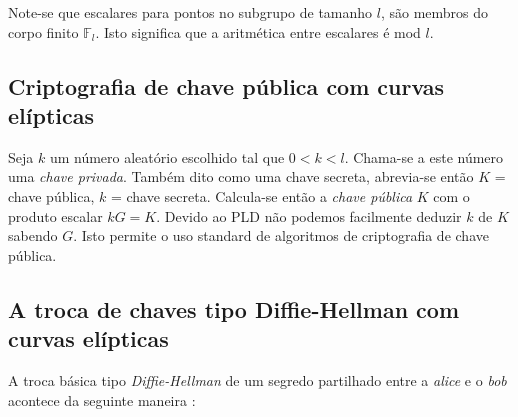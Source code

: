 Note-se que escalares para pontos no subgrupo de tamanho $l$, são membros do corpo finito $\mathbb{F}_l$. Isto significa que a aritmética entre escalares é mod $l$.



\subsection{Criptografia de chave pública com curvas elípticas}
\label{ec:keys}

Seja \(k\) um número aleatório escolhido tal que \(0 < k < l\). Chama-se a este número uma {\em chave privada}. Também dito como uma chave secreta, abrevia-se então 
\(K\) = chave pública, \(k\) = chave secreta.      
Calcula-se então a {\em chave pública} \(K\) com o produto escalar \(k G = K\).
Devido ao PLD não podemos facilmente deduzir \(k\) de \(K\) sabendo \(G\).
Isto permite o uso standard de algoritmos de criptografia de chave pública.



\subsection{A troca de chaves tipo Diffie-Hellman com curvas elípticas}
\label{DH_exchange_section}

A troca básica tipo {\em Diffie-Hellman} \cite{Diffie-Hellman} de um segredo partilhado entre a {\em alice} e o {\em bob} acontece da seguinte maneira :   


